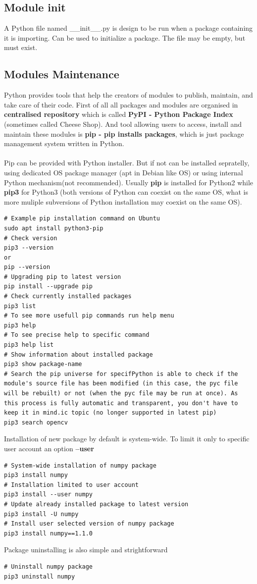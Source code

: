 \documentclass{article}
\begin{document}
\subsection{Module init}
A Python file named \_\_init\_\_.py is design to be run when a package containing it is importing. Can be used to initialize a package. The file may be empty, but must exist.


\subsection{Modules Maintenance}
Python provides tools that help the creators of modules to publish, maintain, and take care of their code. First of all all packages and modules are organised in \textbf{centralised repository} which is called \textbf{PyPI - Python Package Index} (sometimes called Cheese Shop). And tool allowing users to access, install and maintain these modules is \textbf{pip - pip installs packages}, which is just package management system written in Python.
\paragraph{}
Pip can be provided with Python installer. But if not can be installed sepratelly, using dedicated OS package manager (apt in Debian like OS) or using internal Python mechanism(not recommended). Usually \textbf{pip} is installed for Python2 while \textbf{pip3} for Python3 (both versions of Python can coexist on the same OS, what is more muliple subversions of Python installation may coexist on the same OS).
\begin{lstlisting}[style=bash]
# Example pip installation command on Ubuntu
sudo apt install python3-pip
# Check version
pip3 --version
or
pip --version
# Upgrading pip to latest version
pip install --upgrade pip
# Check currently installed packages
pip3 list
# To see more usefull pip commands run help menu
pip3 help
# To see precise help to specific command
pip3 help list
# Show information about installed package
pip3 show package-name
# Search the pip universe for specifPython is able to check if the module's source file has been modified (in this case, the pyc file will be rebuilt) or not (when the pyc file may be run at once). As this process is fully automatic and transparent, you don't have to keep it in mind.ic topic (no longer supported in latest pip)
pip3 search opencv
\end{lstlisting}
Installation of new package by default is system-wide. To limit it only to specific user account an option \textbf{--user}
\begin{lstlisting}[style=bash]
# System-wide installation of numpy package
pip3 install numpy
# Installation limited to user account
pip3 install --user numpy
# Update already installed package to latest version
pip3 install -U numpy
# Install user selected version of numpy package
pip3 install numpy==1.1.0
\end{lstlisting}
Package uninstalling is also simple and strightforward
\begin{lstlisting}[style=bash]
# Uninstall numpy package
pip3 uninstall numpy
\end{lstlisting}
\end{document}
